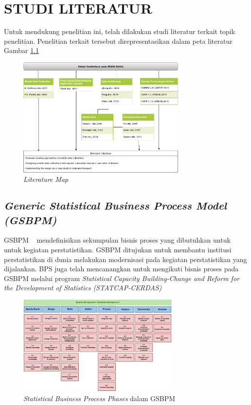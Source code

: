 \chapter{STUDI LITERATUR}
Untuk mendukung penelitian ini, telah dilakukan studi literatur terkait topik penelitian. Penelitian terkait tersebut direpresentasikan dalam peta literatur Gambar \ref{fig:literature-map}

\begin{figure}[H]
    \centering
    \includegraphics[height=6cm]{images/literature-map}
    \caption{\textit{Literature Map}}
    \label{fig:literature-map}
\end{figure}

\section{\textit{Generic Statistical Business Process Model (GSBPM)}}
GSBPM ~\cite{_gsbpm_????} mendefinisikan sekumpulan bisnis proses yang dibutuhkan untuk untuk kegiatan perstatistikan. GSBPM ditujukan untuk membantu institusi perstatistikan di dunia melakukan modernisasi pada kegiatan perstatistikan yang dijalankan. BPS juga telah mencanangkan untuk mengikuti bisnis proses pada GSBPM melalui program \textit{Statistical Capacity Building-Change and Reform for the Development of Statistics (STATCAP-CERDAS)}

\begin{figure}[H]
    \centering
    \includegraphics[height=5cm]{images/GSBPM}
    \caption{\textit{Statistical Business Process Phases} dalam GSBPM}
    \label{fig:gsbpm2}
\end{figure}

